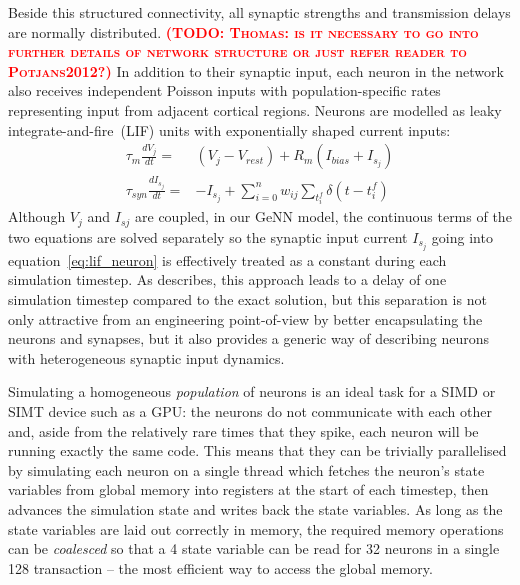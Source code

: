 \documentclass[utf8]{frontiersSCNS} %
\newcommand{\todo}[1]{\textbf{\textsc{\textcolor{red}{(TODO: #1)}}}}
\begin{document}
Beside this structured connectivity, all synaptic strengths and transmission delays are normally distributed.
\todo{Thomas: is it necessary to go into further details of network structure or just refer reader to Potjans2012?}
In addition to their synaptic input, each neuron in the network also receives independent Poisson inputs with population-specific rates representing input from adjacent cortical regions.
Neurons are modelled as leaky integrate-and-fire~(LIF) units with exponentially shaped current inputs:
%
\begin{align}
    \tau_{m} \frac{dV_{j}}{dt} = & (V_{j} - V_{rest}) + R_{m}(I_{bias} + I_{s_{j}}) \label{eq:lif_neuron}\\
    \tau_{syn} \frac{dI_{s_{j}}}{dt} = & -I_{s_{j}} + \sum_{i=0}^{n} w_{ij} \sum_{t_{i}^{f}}  \delta(t - t_{i}^{f})\label{eq:exp_neuron_input_current}
\end{align}
%
Although $V_{j}$ and $I_{s{j}}$ are coupled, in our GeNN model, the continuous terms of the two equations are solved separately so the synaptic input current $I_{s_{j}}$ going into equation~\ref{eq:lif_neuron} is effectively treated as a constant during each simulation timestep.
As \citet{Rotter1999} describes, this approach leads to a delay of one simulation timestep compared to the exact solution, but this separation is not only attractive from an engineering point-of-view by better encapsulating the neurons and synapses, but it also provides a generic way of describing neurons with heterogeneous synaptic input dynamics.

Simulating a homogeneous \textit{population} of neurons is an ideal task for a SIMD or SIMT device such as a GPU: the neurons do not communicate with each other and, aside from the relatively rare times that they spike, each neuron will be running exactly the same code.
This means that they can be trivially parallelised by simulating each neuron on a single thread which fetches the neuron's state variables from global memory into registers at the start of each timestep, then advances the simulation state and writes back the state variables.
As long as the state variables are laid out correctly in memory, the required memory operations can be \textit{coalesced} so that a \SI{4}{\byte} state variable can be read for \num{32} neurons in a single \SI{128}{\byte} transaction -- the most efficient way to access the global memory.
\end{document}
